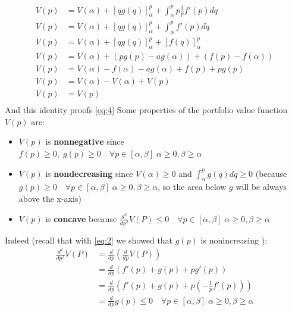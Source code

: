 \documentclass[12pt]{article}
\begin{document}
\begin{align*}
    V(p) & =V(\alpha) + [q g(q)]_{\alpha}^{p}  + \int_{\alpha}^p p \frac{1}{p}f'(p) dq \\
    V(p) & =V(\alpha) + [q g(q)]_{\alpha}^{p}  + \int_{\alpha}^p f'(p) dq              \\
    V(p) & =V(\alpha) + [q g(q)]_{\alpha}^{p}  + [f(q)]_{\alpha}^{p}                   \\
    V(p) & =V(\alpha) + (pg(p)-ag(\alpha))  + (f(p)-f(\alpha))                         \\
    V(p) & =V(\alpha)  -f(\alpha)-ag(\alpha)+f(p)+pg(p)                                \\
    V(p) & =V(\alpha)  -V(\alpha)+V(p)                                                 \\
    V(p) & =V(p)                                                                       \\
\end{align*}
And this identity proofs \eqref{eq:4}
\newline
Some properties of the portfolio value function $V(p)$ are:
\begin{itemize}
    \item $V(p)$ is \textbf{nonnegative} since $f(p)\geq 0, \; g(p)\geq 0 \quad \forall p\in[\alpha,\beta] \; \alpha\geq 0, \beta \geq \alpha$
    \item $V(p)$ is \textbf{nondecreasing} since $V(\alpha)\geq 0$ and $ \int_{\alpha}^p g(q) dq \geq 0$ \newline(because $g(p)\geq 0 \quad \forall p\in[\alpha,\beta] \; \alpha\geq 0, \beta \geq \alpha$, so the area below $g$ will be always above the x-axis)
    \item $V(p)$ is \textbf{concave} because $\frac{d^2}{dp^2}V(P)\leq 0 \quad \forall p\in[\alpha,\beta] \; \alpha\geq 0, \beta \geq \alpha$
\end{itemize}
Indeed (recall that with \eqref{eq:2} we showed that $g(p)$ is nonincreasing
):
\begin{align*}
    \frac{d^2}{dp^2}V(P) & =\frac{d}{dp} \left(\frac{d}{dp}V(P)\right)                                                   \\
                         & =\frac{d}{dp} \left(f'(p) +g(p) +pg'(p)\right)                                                \\
                         & =\frac{d}{dp} \left(f'(p) +g(p) +p\left(-\frac{1}{p}f'(p)\right) \right)                      \\
                         & =\frac{d}{dp} g(p) \leq 0 \quad \forall p\in[\alpha,\beta] \; \alpha\geq 0, \beta \geq \alpha \\
\end{align*}
\end{document}
